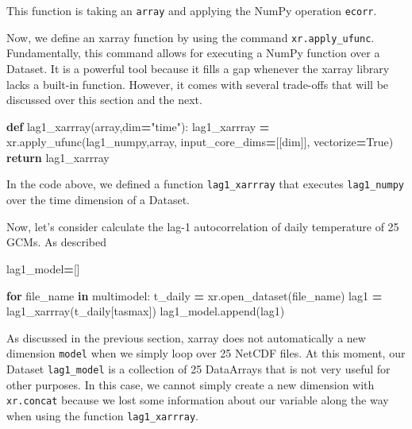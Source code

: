 \documentclass[
]{book}
\newenvironment{Shaded}{\begin{snugshade}}{\end{snugshade}}
\newcommand{\ControlFlowTok}[1]{\textcolor[rgb]{0.13,0.29,0.53}{\textbf{#1}}}
\newcommand{\KeywordTok}[1]{\textcolor[rgb]{0.13,0.29,0.53}{\textbf{#1}}}
\newcommand{\NormalTok}[1]{#1}
\newcommand{\OperatorTok}[1]{\textcolor[rgb]{0.81,0.36,0.00}{\textbf{#1}}}
\newcommand{\StringTok}[1]{\textcolor[rgb]{0.31,0.60,0.02}{#1}}
\newcommand{\VariableTok}[1]{\textcolor[rgb]{0.00,0.00,0.00}{#1}}
\begin{document}
This function is taking an \texttt{array} and applying the NumPy operation \texttt{ecorr}.

Now, we define an xarray function by using the command \texttt{xr.apply\_ufunc}. Fundamentally, this command allows for executing a NumPy function over a Dataset. It is a powerful tool because it fills a gap whenever the xarray library lacks a built-in function. However, it comes with several trade-offs that will be discussed over this section and the next.

\begin{Shaded}
\begin{Highlighting}[]
\KeywordTok{def}\NormalTok{ lag1\_xarrray(array,dim}\OperatorTok{=}\StringTok{"time"}\NormalTok{):}
\NormalTok{    lag1\_xarrray }\OperatorTok{=}\NormalTok{ xr.apply\_ufunc(lag1\_numpy,array,}
\NormalTok{                     input\_core\_dims}\OperatorTok{=}\NormalTok{[[dim]], }
\NormalTok{                     vectorize}\OperatorTok{=}\VariableTok{True}\NormalTok{)}
    \ControlFlowTok{return}\NormalTok{ lag1\_xarrray}
\end{Highlighting}
\end{Shaded}

In the code above, we defined a function \texttt{lag1\_xarrray} that executes \texttt{lag1\_numpy} over the time dimension of a Dataset.

Now, let's consider calculate the lag-1 autocorrelation of daily temperature of 25 GCMs. As described

\begin{Shaded}
\begin{Highlighting}[]
\NormalTok{lag1\_model}\OperatorTok{=}\NormalTok{[]}

\ControlFlowTok{for}\NormalTok{ file\_name }\KeywordTok{in}\NormalTok{ multimodel:}
\NormalTok{        t\_daily }\OperatorTok{=}\NormalTok{ xr.open\_dataset(file\_name)}
\NormalTok{        lag1 }\OperatorTok{=}\NormalTok{ lag1\_xarrray(t\_daily[}\StringTok{\textquotesingle{}tasmax\textquotesingle{}}\NormalTok{])}
\NormalTok{        lag1\_model.append(lag1)}
\end{Highlighting}
\end{Shaded}

As discussed in the previous section, xarray does not automatically a new dimension \texttt{model} when we simply loop over 25 NetCDF files. At this moment, our Dataset \texttt{lag1\_model} is a collection of 25 DataArrays that is not very useful for other purposes. In this case, we cannot simply create a new dimension with \texttt{xr.concat} because we lost some information about our variable along the way when using the function \texttt{lag1\_xarrray}.
\end{document}
